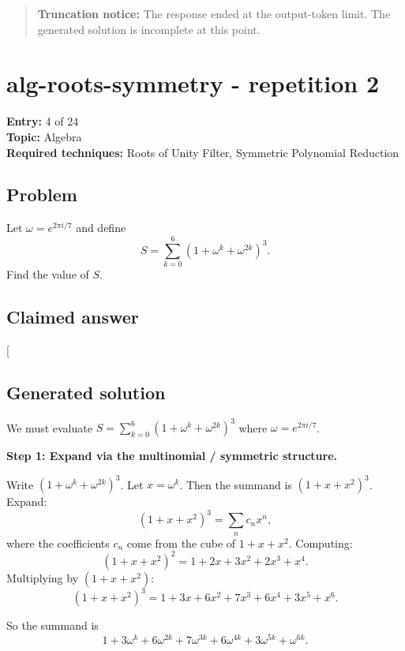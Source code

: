 \documentclass[
  11pt,
  letterpaper,
]{article}
\begin{document}
\begin{quote}
\textbf{Truncation notice:} The response ended at the output-token
limit. The generated solution is incomplete at this point.
\end{quote}

\clearpage

\section{alg-roots-symmetry - repetition
2}\label{alg-roots-symmetry---repetition-2}

\textbf{Entry:} 4 of 24\\
\textbf{Topic:} Algebra\\
\textbf{Required techniques:} Roots of Unity Filter, Symmetric
Polynomial Reduction

\subsection{Problem}\label{problem-3}

Let \(\omega = e^{2\pi i/7}\) and define
\[S = \sum_{k=0}^{6} \left(1 + \omega^k + \omega^{2k}\right)^3.\] Find
the value of \(S\).

\subsection{Claimed answer}\label{claimed-answer-3}

{[}\boxed{60}{]}

\subsection{Generated solution}\label{generated-solution-3}

We must evaluate
\(S = \sum_{k=0}^{6} \left(1 + \omega^k + \omega^{2k}\right)^3\) where
\(\omega = e^{2\pi i/7}\).

\textbf{Step 1: Expand via the multinomial / symmetric structure.}

Write \(\left(1 + \omega^k + \omega^{2k}\right)^3\). Let
\(x = \omega^k\). Then the summand is \((1 + x + x^2)^3\). Expand:
\[(1 + x + x^2)^3 = \sum_{n} c_n x^n,\] where the coefficients \(c_n\)
come from the cube of \(1+x+x^2\). Computing:
\[(1+x+x^2)^2 = 1 + 2x + 3x^2 + 2x^3 + x^4.\] Multiplying by
\((1+x+x^2)\):
\[(1+x+x^2)^3 = 1 + 3x + 6x^2 + 7x^3 + 6x^4 + 3x^5 + x^6.\]

So the summand is
\[1 + 3\omega^k + 6\omega^{2k} + 7\omega^{3k} + 6\omega^{4k} + 3\omega^{5k} + \omega^{6k}.\]
\end{document}
